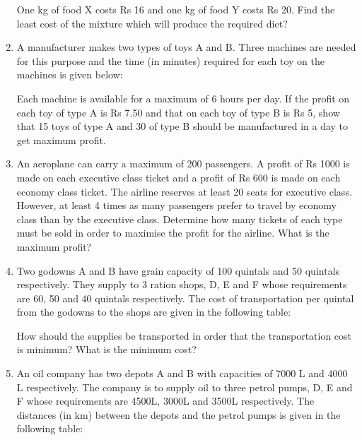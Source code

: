 \documentclass[journal,12pt,twocolumn]{IEEEtran}
\begin{document}
\begin{enumerate}
One kg of food X costs Rs 16 and one kg of food Y costs Rs 20. Find the least cost of the mixture which will produce the required diet?

\item A manufacturer makes two types of toys A and B. Three machines are needed
for this purpose and the time (in minutes) required for each toy on the machines is given below:

\begin{table}[h]
\centering

\caption{}
\end{table}

Each machine is available for a maximum of 6 hours per day. If the profit on each toy of type A is Rs 7.50 and that on each toy of type B is Rs 5, show that 15 toys of type A and 30 of type B should be manufactured in a day to get maximum profit.

\item An aeroplane can carry a maximum of 200 passengers. A profit of Rs 1000 is made on each executive class ticket and a profit of Rs 600 is made on each
economy class ticket. The airline reserves at least 20 seats for executive class. However, at least 4 times as many passengers prefer to travel by economy class than by the executive class. Determine how many tickets of each type must be sold in order to maximise the profit for the airline. What is the maximum profit?

\item Two godowns A and B have grain capacity of 100 quintals and 50 quintals respectively. They supply to 3 ration shops, D, E and F whose requirements are 60, 50 and 40 quintals respectively. The cost of transportation per quintal from the godowns to the shops are given in the following table:

\begin{table}[h]
\centering

\caption{}
\end{table}

How should the supplies be transported in order that the transportation cost is minimum? What is the minimum cost?

\item An oil company has two depots A and B with capacities of 7000 L and 4000 L respectively. The company is to supply oil to three petrol pumps, D, E and F whose requirements are 4500L, 3000L and 3500L respectively. The distances (in km) between the depots and the petrol pumps is given in the following table:


\end{enumerate}
\end{document}
